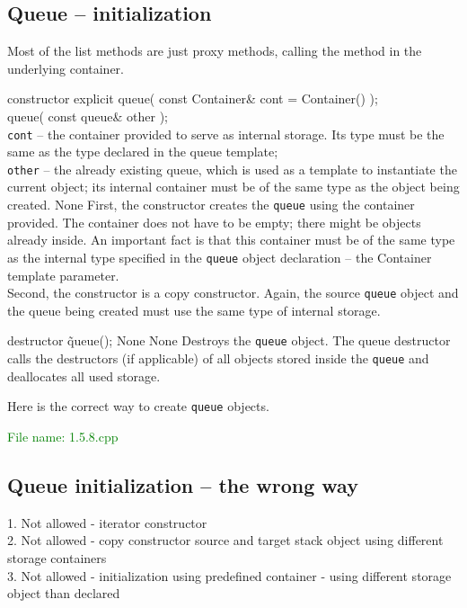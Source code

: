 \subsection{Queue – initialization} %
Most of the list methods are just proxy methods, calling the method in the underlying container.
\begin{methodinfo}
  {constructor}
  {explicit queue( const Container& cont = Container() );\\
   queue( const queue& other );}
  {\\\texttt{cont} – the container provided to serve as internal storage. Its type must be the same as 
  the type declared in the queue template; \\
  \texttt{other} – the already existing queue, which is used as a template to instantiate the current 
  object; its internal container must be of the same type as the object being created.}
  {None}
  {First, the constructor creates the \texttt{queue} using the container provided. The container does 
  not have to be empty; there might be objects already inside. An important fact is that this container 
  must be of the same type as the internal type specified in the \texttt{queue} object declaration – 
  the Container template parameter.\\
  Second, the constructor is a copy constructor. Again, the source \texttt{queue} object and the queue 
  being created must use the same type of internal storage.}
\end{methodinfo}

\begin{methodinfo}
  {destructor}
  {\~queue();}
  {None}
  {None}
  {Destroys the \texttt{queue} object. The queue destructor calls the destructors (if applicable) of all 
  objects stored inside the \texttt{queue} and deallocates all used storage.}
\end{methodinfo}
Here is the correct way to create \texttt{queue} objects.

\textcolor{green}{File name: 1.5.8.cpp}


\subsection{Queue initialization – the wrong way} %
1. Not allowed - iterator constructor\\
2. Not allowed - copy constructor source and target stack object using different storage containers\\
3. Not allowed - initialization using predefined container - using different storage object than declared

